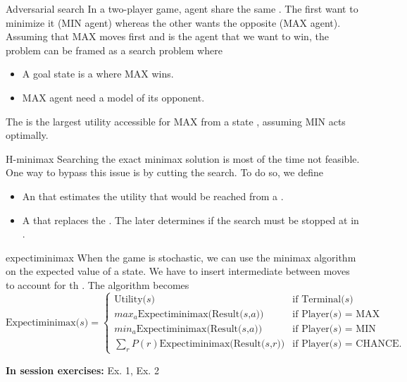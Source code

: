 \documentclass[11pt, a4paper]{article}
\begin{document}
\begin{thbox}{Adversarial search}
    In a two-player game, agent share the same . 
    The first want to minimize it (MIN agent) whereas the other wants the opposite (MAX agent).
    Assuming that MAX moves first and is the agent that we want to win, the problem can be framed as a search problem where
    \begin{itemize}
        \item A goal state is a  where MAX wins.
        \item MAX agent need a model of its opponent.
    \end{itemize}

    The  is the largest utility accessible for MAX from a state , assuming MIN acts optimally.
\end{thbox}
\begin{thbox}{H-minimax}
    Searching the exact minimax solution is most of the time not feasible. One way to bypass this issue is by cutting the search.
    To do so, we define 
    \begin{itemize}
        \item An  that estimates the utility that would be reached from a .
        \item A  that replaces the . The later determines if the search must be stopped at  in .
    \end{itemize}
\end{thbox}
\begin{thbox}{expectiminimax}
    When the game is stochastic, we can use the minimax algorithm on the expected value of a state. We have to insert intermediate  between moves to account for th .
    The algorithm becomes 
    \[
    \text{Expectiminimax($s$)} = 
    \begin{cases}
        \text{Utility($s$)} & \text{if Terminal($s$)}\\
        max_a \text{Expectiminimax(Result($s$,$a$))} & \text{if Player($s$) = MAX}\\
        min_a \text{Expectiminimax(Result($s$,$a$))} & \text{if Player($s$) = MIN}\\
        \sum_r P(r) \text{Expectiminimax(Result($s$,$r$))} & \text{if Player($s$) = CHANCE}.
    \end{cases}
    \]
\end{thbox}
\textbf{In session exercises:} Ex. 1, Ex. 2 
\end{document}
